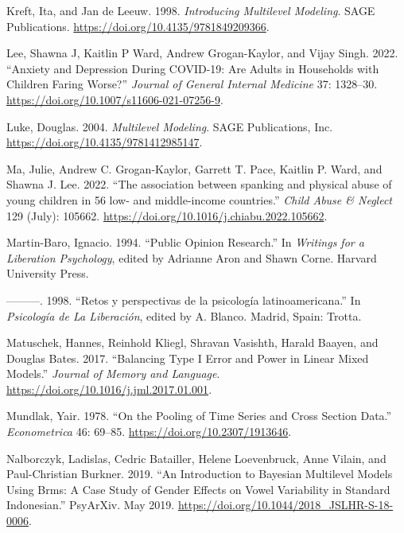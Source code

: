\documentclass[
  letterpaper,
  DIV=11,
  numbers=noendperiod]{scrreprt}
\newlength{\cslhangindent}
\newlength{\cslentryspacingunit} %
\newenvironment{CSLReferences}[2] %
 {%
  \setlength{\parindent}{0pt}
  \ifodd #1
  \let\oldpar\par
  \def\par{\hangindent=\cslhangindent\oldpar}
  \fi
  \setlength{\parskip}{#2\cslentryspacingunit}
 }%
 {}
\begin{document}
\begin{CSLReferences}{1}{0}
\leavevmode{}%
Kreft, Ita, and Jan de Leeuw. 1998. \emph{Introducing Multilevel
Modeling}. SAGE Publications.
\url{https://doi.org/10.4135/9781849209366}.

\leavevmode{}%
Lee, Shawna J, Kaitlin P Ward, Andrew Grogan-Kaylor, and Vijay Singh.
2022. {``Anxiety and Depression During {COVID-19}: Are Adults in
Households with Children Faring Worse?''} \emph{Journal of General
Internal Medicine} 37: 1328--30.
\url{https://doi.org/10.1007/s11606-021-07256-9}.

\leavevmode{}%
Luke, Douglas. 2004. \emph{Multilevel Modeling}. SAGE Publications, Inc.
\url{https://doi.org/10.4135/9781412985147}.

\leavevmode{}%
Ma, Julie, Andrew C. Grogan-Kaylor, Garrett T. Pace, Kaitlin P. Ward,
and Shawna J. Lee. 2022. {``{The association between spanking and
physical abuse of young children in 56 low- and middle-income
countries}.''} \emph{Child Abuse \& Neglect} 129 (July): 105662.
\url{https://doi.org/10.1016/j.chiabu.2022.105662}.

\leavevmode{}%
Martin-Baro, Ignacio. 1994. {``Public Opinion Research.''} In
\emph{Writings for a Liberation Psychology}, edited by Adrianne Aron and
Shawn Corne. Harvard University Press.

\leavevmode{}%
---------. 1998. {``{Retos y perspectivas de la psicología
latinoamericana}.''} In \emph{Psicología de La Liberación}, edited by A.
Blanco. Madrid, Spain: Trotta.

\leavevmode{}%
Matuschek, Hannes, Reinhold Kliegl, Shravan Vasishth, Harald Baayen, and
Douglas Bates. 2017. {``Balancing Type {I} Error and Power in Linear
Mixed Models.''} \emph{Journal of Memory and Language}.
\url{https://doi.org/10.1016/j.jml.2017.01.001}.

\leavevmode{}%
Mundlak, Yair. 1978. {``On the Pooling of Time Series and Cross Section
Data.''} \emph{Econometrica} 46: 69--85.
\url{https://doi.org/10.2307/1913646}.

\leavevmode{}%
Nalborczyk, Ladislas, Cedric Batailler, Helene Loevenbruck, Anne Vilain,
and Paul-Christian Burkner. 2019. {``An Introduction to {B}ayesian
Multilevel Models Using Brms: A Case Study of Gender Effects on Vowel
Variability in Standard {I}ndonesian.''} PsyArXiv. May 2019.
\url{https://doi.org/10.1044/2018_JSLHR-S-18-0006}.


\end{CSLReferences}
\end{document}
